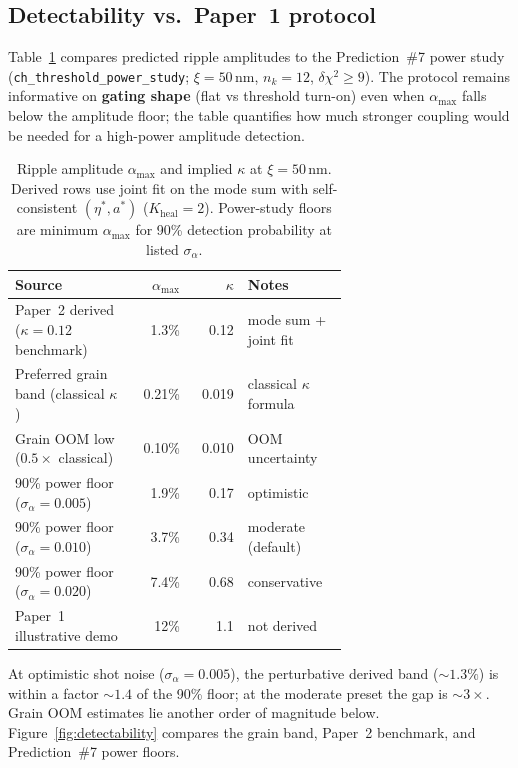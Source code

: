 \documentclass[11pt,a4paper]{article}
\begin{document}
\subsection{Detectability vs.\ Paper~1 protocol}
\label{sec:detectability}

Table~\ref{tab:detectability} compares predicted ripple amplitudes to the Prediction~\#7 power study
(\texttt{ch\_threshold\_power\_study}; $\xi = 50$\,nm, $n_k = 12$, $\delta\chi^2 \ge 9$).
The protocol remains informative on \textbf{gating shape} (flat vs threshold turn-on) even when
$\alpha_{\max}$ falls below the amplitude floor; the table quantifies how much stronger coupling would be
needed for a high-power amplitude detection.

\begin{table}[ht]
  \centering
  \small
  \caption{Ripple amplitude $\alpha_{\max}$ and implied $\kappa$ at $\xi = 50$\,nm.
  Derived rows use joint fit on the mode sum with self-consistent $(\eta^*, a^*)$ ($K_{\mathrm{heal}} = 2$).
  Power-study floors are minimum $\alpha_{\max}$ for 90\% detection probability at listed $\sigma_\alpha$.}
  \label{tab:detectability}
  \begin{tabular}{@{}p{0.36\linewidth}rrp{0.30\linewidth}@{}}
    \toprule
    Source & $\alpha_{\max}$ & $\kappa$ & Notes \\
    \midrule
    Paper~2 derived ($\kappa = 0.12$ benchmark) & 1.3\% & 0.12 & mode sum + joint fit \\
    Preferred grain band (classical $\kappa$) & 0.21\% & 0.019 & classical $\kappa$ formula \\
    Grain OOM low ($0.5\times$ classical) & 0.10\% & 0.010 & OOM uncertainty \\
    \midrule
    90\% power floor ($\sigma_\alpha = 0.005$) & 1.9\% & 0.17 & optimistic \\
    90\% power floor ($\sigma_\alpha = 0.010$) & 3.7\% & 0.34 & moderate (default) \\
    90\% power floor ($\sigma_\alpha = 0.020$) & 7.4\% & 0.68 & conservative \\
  \midrule
    Paper~1 illustrative demo & 12\% & 1.1 & not derived \\
    \bottomrule
  \end{tabular}
\end{table}

At optimistic shot noise ($\sigma_\alpha = 0.005$), the perturbative derived band ($\sim 1.3\%$) is
within a factor $\sim 1.4$ of the 90\% floor; at the moderate preset the gap is $\sim 3\times$.
Grain OOM estimates lie another order of magnitude below.
Figure~\ref{fig:detectability} compares the grain band, Paper~2 benchmark, and Prediction~\#7 power floors.
\end{document}
